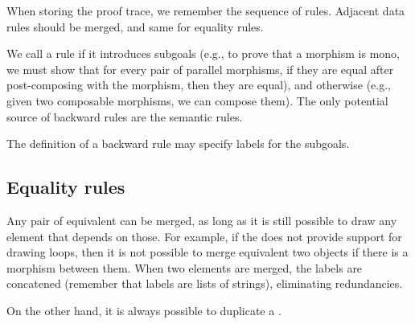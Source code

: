 \documentclass{article}
\begin{document}
When storing the proof trace, we remember the sequence of rules. Adjacent data rules should be merged, and same for equality rules. 

We call a rule \AP\emph{} if it introduces subgoals (e.g., to prove that a morphism is mono, we must show that for every pair of parallel morphisms, if they are equal after post-composing with the morphism, then they are equal), and \AP\emph{} otherwise (e.g., given two composable morphisms, we can compose them). The only potential source of backward rules are the semantic rules.

The definition of a backward rule may specify labels for the subgoals.
\subsection{Equality rules}
Any pair of equivalent  can be merged, as long as it is still possible to draw any element that depends on those. For example, if the  does not provide support for drawing loops, then it is not possible to merge equivalent two objects if there is a morphism between them.
When two elements are merged, the labels are concatened (remember that labels are lists of strings), eliminating redundancies.

On the other hand, it is always possible to duplicate a . 
\end{document}
